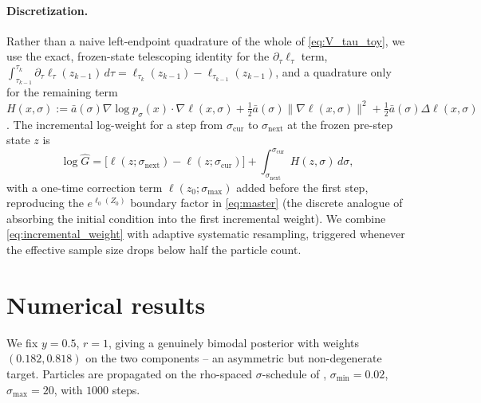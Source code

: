 \documentclass[english,10pt]{article}
\numberwithin{equation}{section}
\begin{document}
\paragraph{Discretization.} Rather than a naive left-endpoint quadrature of
the whole of \eqref{eq:V_tau_toy}, we use the exact, frozen-state telescoping
identity for the $\partial_\tau\ell_\tau$ term,
$\int_{\tau_{k-1}}^{\tau_k}\partial_\tau\ell_\tau(z_{k-1})\,d\tau = \ell_{\tau_k}(z_{k-1})-\ell_{\tau_{k-1}}(z_{k-1})$,
and a quadrature only for the remaining term
$H(x,\sigma):=\bar a(\sigma)\nabla\log p_\sigma(x)\cdot\nabla\ell(x,\sigma)+\tfrac12\bar a(\sigma)\|\nabla\ell(x,\sigma)\|^2+\tfrac12\bar a(\sigma)\Delta\ell(x,\sigma)$.
The incremental log-weight for a step from $\sigma_{\mathrm{cur}}$ to
$\sigma_{\mathrm{next}}$ at the frozen pre-step state $z$ is
\begin{equation}
\log\hat G = \big[\ell(z;\sigma_{\mathrm{next}}) - \ell(z;\sigma_{\mathrm{cur}})\big] + \int_{\sigma_{\mathrm{next}}}^{\sigma_{\mathrm{cur}}}\! H(z,\sigma)\,d\sigma,
\label{eq:incremental_weight}
\end{equation}
with a one-time correction term $\ell(z_0;\sigma_{\max})$ added before the
first step, reproducing the $e^{\ell_0(Z_0)}$ boundary factor in
\eqref{eq:master} (the discrete analogue of absorbing the initial condition
into the first incremental weight). We combine \eqref{eq:incremental_weight}
with adaptive systematic resampling, triggered whenever the effective sample
size drops below half the particle count.

\section{Numerical results}
\label{sec:results}

We fix $y=0.5$, $r=1$, giving a genuinely bimodal posterior with weights
$(0.182, 0.818)$ on the two components -- an asymmetric but non-degenerate
target. Particles are propagated on the rho-spaced $\sigma$-schedule of
\citep{karras2022elucidating}, $\sigma_{\min}=0.02$, $\sigma_{\max}=20$, with
$1000$ steps.
\end{document}
